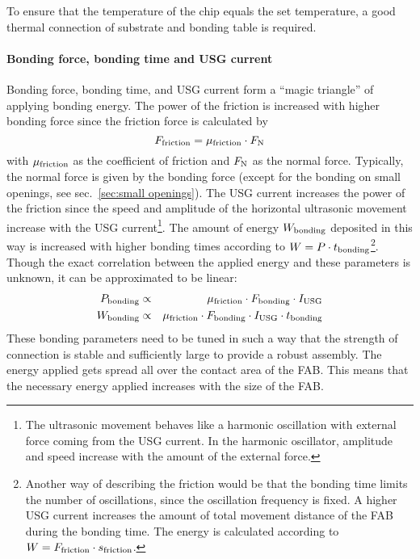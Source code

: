 To ensure that the temperature of the chip equals the set temperature, a good thermal connection of substrate and bonding table is required. %

\paragraph*{Bonding force, bonding time and \ac{USG} current}
Bonding force, bonding time, and \ac{USG} current form a ``magic triangle'' of applying bonding energy. The power of the friction is increased with higher bonding force since the friction force is calculated by 
\begin{equation}
F_{\rm{friction}}=\mu_{\rm{friction}}\cdot F_{\rm{N}}\label{equ:friction}
\end{equation}
with $\mu_{\rm{friction}}$ as the coefficient of friction and $F_{\rm{N}}$ as the normal force. Typically, the normal force is given by the bonding force (except for the bonding on small openings, see sec.~\ref{sec:small openings}). The \ac{USG} current increases the power of the friction since the speed and amplitude of the horizontal ultrasonic movement increase with the \ac{USG} current\footnote{The ultrasonic movement behaves like a harmonic oscillation with external force coming from the \ac{USG} current. In the harmonic oscillator, amplitude and speed increase with the amount of the external force.}. The amount of energy $W_{\rm{bonding}}$ deposited in this way is increased with higher bonding times according to $W=P\cdot t_{\rm{bonding}}$\footnote{Another way of describing the friction would be that the bonding time limits the number of oscillations, since the oscillation frequency is fixed. A higher \ac{USG} current increases the amount of total movement distance of the \ac{FAB} during the bonding time. The energy is calculated according to $W=F_{\rm{friction}}\cdot s_{\rm{friction}}$.}. Though the exact correlation between the applied energy and these parameters is unknown, it can be approximated to be linear:
\begin{eqnarray}\label{equ:bonding_energy}
P_{\rm{bonding}}  &\propto & \mu_{\rm{friction}}\cdot F_{\rm{bonding}}\cdot I_{\rm{USG}}\\
W_{\rm{bonding}}  &\propto & \mu_{\rm{friction}}\cdot F_{\rm{bonding}}\cdot I_{\rm{USG}}\cdot t_{\rm{bonding}}
\end{eqnarray}
These bonding parameters need to be tuned in such a way that the strength of connection is stable and sufficiently large to provide a robust assembly. The energy applied gets spread all over the contact area of the \ac{FAB}. This means that the necessary energy applied increases with the size of the \ac{FAB}.

